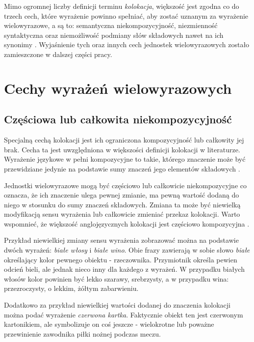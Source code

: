 \par
Mimo ogromnej liczby definicji terminu \emph{kolokacja}, większość jest zgodna co do trzech cech, które wyrażenie powinno spełniać, aby zostać uznanym za wyrażenie wielowyrazowe, a są to: semantyczna niekompozycyjność, niezmienność syntaktyczna oraz niemożliwość podmiany słów składowych nawet na ich synonimy \cite[str. 16]{evert}. 
Wyjaśnienie tych oraz innych cech jednostek wielowyrazowych zostało zamieszczone w dalszej części pracy.	



\section{Cechy wyrażeń wielowyrazowych}

\subsection{Częściowa lub całkowita niekompozycyjność}
Specjalną cechą kolokacji jest ich ograniczona kompozycyjność lub całkowity jej brak.
Cecha ta jest uwzględniona w większości definicji kolokacji w literaturze.
Wyrażenie językowe w pełni kompozycyjne to takie, którego znaczenie może być przewidziane jedynie na podstawie sumy znaczeń jego elementów składowych \cite[str. 151, 184]{mit}.
\par
Jednostki wielowyrazowe mogą być częściowo lub całkowicie niekompozycyjne co oznacza, że ich znaczenie ulega pewnej zmianie, ma pewną wartość dodaną do niego w stosunku do sumy znaczeń składowych.
Zmiana ta może być niewielką modyfikacją sensu wyrażenia lub całkowicie zmieniać przekaz kolokacji. 
Warto wspomnieć, że większość anglojęzycznych kolokacji jest częściowo kompozycyjna \cite[str. 151]{mit}.
\par
Przykład niewielkiej zmiany sensu wyrażenia zobrazować można na podstawie dwóch wyrażeń: \emph{białe włosy} i \emph{białe wino}.
Obie frazy zawierają w sobie słowo \emph{białe} określający kolor pewnego obiektu - rzeczownika. 
Przymiotnik określa pewien odcień bieli, ale jednak nieco inny dla każdego z wyrażeń. 
W przypadku białych włosów kolor powinien być lekko szarawy, srebrzysty, a w przypadku wina: przezroczysty, o lekkim, żółtym zabarwieniu.
\par
Dodatkowo za przykład niewielkiej wartości dodanej do znaczenia kolokacji można podać wyrażenie \emph{czerwona kartka}. 
Faktycznie obiekt ten jest czerwonym kartonikiem, ale symbolizuje on coś jeszcze - wielokrotne lub poważne przewinienie zawodnika piłki nożnej podczas meczu.
